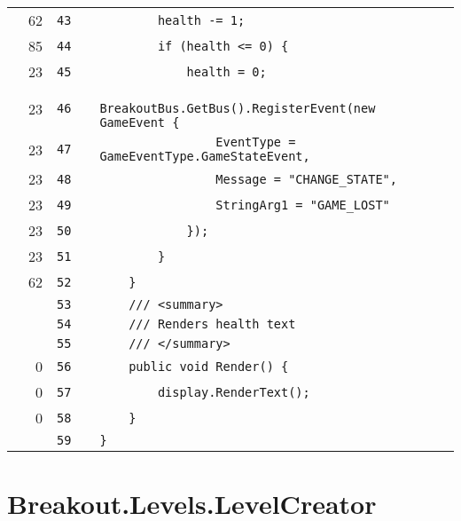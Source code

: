 \documentclass[a4paper,landscape,10pt]{article}
\begin{document}
\begin{longtable}[l]{lrrll}
\cellcolor{green} & 62 & \verb~43~ & & \verb~        health -= 1;~\\
\cellcolor{green} & 85 & \verb~44~ & & \verb~        if (health <= 0) {~\\
\cellcolor{green} & 23 & \verb~45~ & & \verb~            health = 0;~\\
\cellcolor{green} & 23 & \verb~46~ & & \verb~            BreakoutBus.GetBus().RegisterEvent(new GameEvent {~\\
\cellcolor{green} & 23 & \verb~47~ & & \verb~                EventType = GameEventType.GameStateEvent,~\\
\cellcolor{green} & 23 & \verb~48~ & & \verb~                Message = "CHANGE_STATE",~\\
\cellcolor{green} & 23 & \verb~49~ & & \verb~                StringArg1 = "GAME_LOST"~\\
\cellcolor{green} & 23 & \verb~50~ & & \verb~            });~\\
\cellcolor{green} & 23 & \verb~51~ & & \verb~        }~\\
\cellcolor{green} & 62 & \verb~52~ & & \verb~    }~\\
\cellcolor{gray} &  & \verb~53~ & & \verb~    /// <summary>~\\
\cellcolor{gray} &  & \verb~54~ & & \verb~    /// Renders health text~\\
\cellcolor{gray} &  & \verb~55~ & & \verb~    /// </summary>~\\
\cellcolor{red} & 0 & \verb~56~ & & \verb~    public void Render() {~\\
\cellcolor{red} & 0 & \verb~57~ & & \verb~        display.RenderText();~\\
\cellcolor{red} & 0 & \verb~58~ & & \verb~    }~\\
\cellcolor{gray} &  & \verb~59~ & & \verb~}~\\
\end{longtable}
\newpage
\section{Breakout.Levels.LevelCreator}
\end{document}
